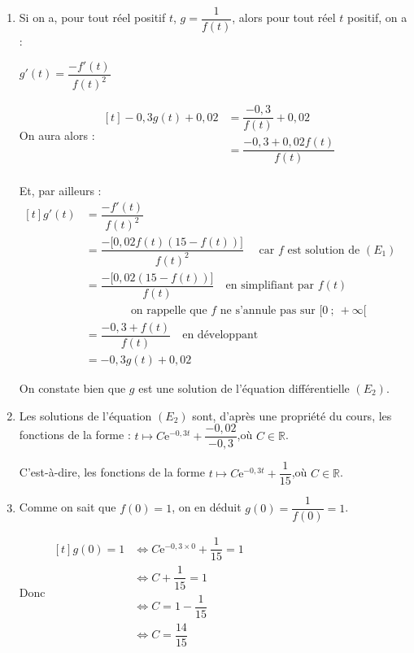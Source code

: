 \documentclass[10pt]{article}
\providecommand{\R}{\mathbb{R}}
\providecommand{\e}{{\mathrm{e}}}
\begin{document}
\begin{enumerate}
	\item Si on a, pour tout réel positif $t$, \quad$g = \dfrac{1}{f(t)}$, alors pour tout réel $t$ positif, on a :

	$g'(t) = \dfrac{-f'(t)}{f(t)^2}$

	On aura alors : \quad
	$\begin{aligned}[t]
		-0,3g(t) + 0,02
		&= \dfrac{-0,3}{f(t)} + 0,02 \\
		&= \dfrac{-0,3 + 0,02f(t)}{f(t)}\\
	\end{aligned}$

	Et, par ailleurs : \quad
	$\begin{aligned}[t]
		g'(t)
		&= \dfrac{-f'(t)}{f(t)^2} \\
		&= \dfrac{-\big[0,02f(t)(15 - f(t))\big]}{f(t)^2}\quad \text{ car $f$ est solution de }(E_1)\\
		&= \dfrac{-\big[0,02(15 - f(t))\big]}{f(t)}\quad \text{en simplifiant par } f(t) \\
		&\qquad\qquad \text{on rappelle que $f$ ne s'annule pas sur $[0~;~ +\infty[$}\\
		&= \dfrac{-0,3 + f(t)}{f(t)}\quad \text{en développant}\\
		&=-0,3g(t) + 0,02
	\end{aligned}$

	On constate bien que $g$ est une solution de l'équation différentielle $(E_2)$.

	\item Les solutions de l'équation $(E_2)$ sont, d'après une propriété du cours, les fonctions de la forme :
	\quad
	$t \longmapsto C \e^{-0,3t} + \dfrac{-0,02}{-0,3}$,\quad où $C \in \R$.

	C'est-à-dire, les fonctions de la forme \quad
	$t \longmapsto C \e^{-0,3t} + \dfrac{1}{15}$,\quad où $C \in \R$.

	\item Comme on sait que $f(0) = 1$, on en déduit $g(0) = \dfrac{1}{f(0)} = 1$.

	Donc \quad
	$\begin{aligned}[t]
		g(0) = 1
		&\iff C \e^{-0,3\times 0} + \dfrac{1}{15} = 1\\
		&\iff C + \dfrac{1}{15} = 1\\
		&\iff C = 1 - \dfrac{1}{15}\\
		&\iff C = \dfrac{14}{15}\\
	\end{aligned}$


\end{enumerate}
\end{document}
